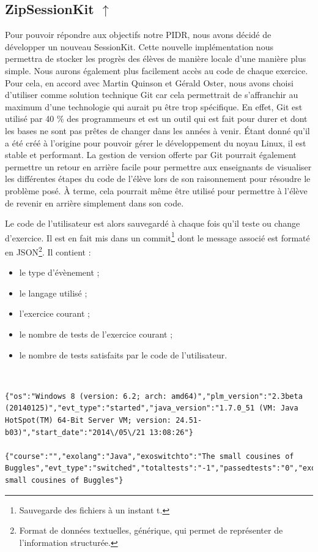 \subsection[ZipSessionKit]{ZipSessionKit \hyperref[zipSessionPb]{$\uparrow$}}
\label{zipSessionSol}

Pour pouvoir répondre aux objectifs notre PIDR, nous avons décidé de développer un nouveau SessionKit. Cette nouvelle implémentation nous permettra de stocker les progrès des élèves de manière locale d'une manière plus simple. Nous aurons également plus facilement accès au code de chaque exercice. Pour cela, en accord avec Martin Quinson et Gérald Oster, nous avons choisi d'utiliser comme solution technique Git car cela permettrait de s'affranchir au maximum d'une technologie qui aurait pu être trop spécifique. En effet, Git est utilisé par 40 \%\cite{GitUsage} des programmeurs et est un outil qui est fait pour durer et dont les bases ne sont pas prêtes de changer dans les années à venir. Étant donné qu'il a été créé à l'origine pour pouvoir gérer le développement du noyau Linux, il est stable et performant. La gestion de version offerte par Git pourrait également permettre un retour en arrière facile pour permettre aux enseignants de visualiser les différentes étapes du code de l'élève lors de son raisonnement pour résoudre le problème posé. À terme, cela pourrait même être utilisé pour permettre à l'élève de revenir en arrière simplement dans son code.


Le code de l'utilisateur est alors sauvegardé à chaque fois qu'il teste ou change d'exercice. Il est en fait mis dans un commit\footnote{Sauvegarde des fichiers à un instant t.} dont le message associé est formaté en JSON\footnote{Format de données textuelles, générique, qui permet de représenter de l'information structurée.}. Il contient :
\begin{itemize}
\item le type d'évènement ;
\item le langage utilisé ;
\item l'exercice courant ;
\item le nombre de tests de l'exercice courant ;
\item le nombre de tests satisfaits par le code de l'utilisateur.
\end{itemize}

$ $

\begin{lstlisting}[language = plm,basicstyle={\footnotesize\ttfamily}, caption= Message de commit]
{"os":"Windows 8 (version: 6.2; arch: amd64)","plm_version":"2.3beta (20140125)","evt_type":"started","java_version":"1.7.0_51 (VM: Java HotSpot(TM) 64-Bit Server VM; version: 24.51-b03)","start_date":"2014\/05\/21 13:08:26"}

{"course":"","exolang":"Java","exoswitchto":"The small cousines of Buggles","evt_type":"switched","totaltests":"-1","passedtests":"0","exoname":"The small cousines of Buggles"}
\end{lstlisting}

